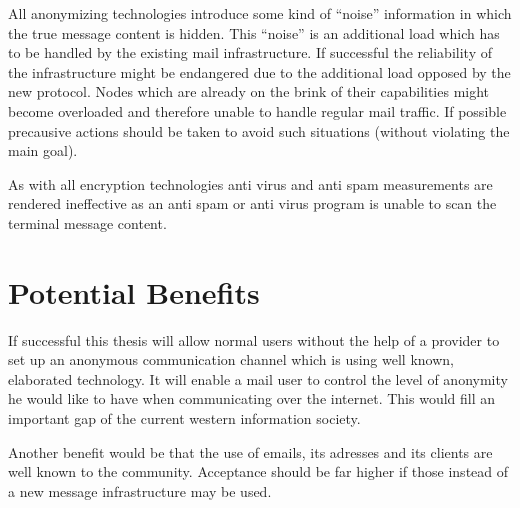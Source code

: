 \documentclass[twocolumn,a4paper,10pt,english]{article}
\begin{document}
All anonymizing technologies introduce some kind of ``noise'' information in which the true message content is hidden. This ``noise'' is an additional load which has to be handled by the existing mail infrastructure. If successful the reliability of the infrastructure might be endangered due to the additional load opposed by the new protocol. Nodes which are already on the brink of their capabilities might become overloaded and therefore unable to handle regular mail traffic. If possible precausive actions should be taken to avoid such situations (without violating the main goal).\par

As with all encryption technologies anti virus and anti spam measurements are rendered ineffective as an anti spam or anti virus program is unable to scan the terminal message content.\par

\section{Potential Benefits}
If successful this thesis will allow normal users without the help of a provider to set up an anonymous communication channel which is using well known, elaborated technology. It will enable a mail user to control the level of anonymity he would like to have when communicating over the internet. This would fill an important gap of the current western information society. \par

Another benefit would be that the use of emails, its adresses and its clients are well known to the community. Acceptance should be far higher if those instead of a new message infrastructure may be used.\par
\end{document}
